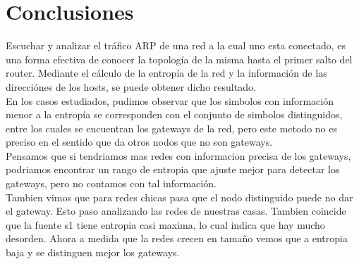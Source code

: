 \section{Conclusiones}

Escuchar y analizar el tráfico ARP de una red a la cual uno esta conectado, 
es una forma efectiva de conocer la topología de la misma hasta el primer salto del router.
Mediante el cálculo de la entropía de la red y la información de las direcciónes de los hosts, se puede obtener dicho resultado.\\
En los casos estudiados, pudimos observar que los simbolos con información menor a la entropía se corresponden con el conjunto de simbolos distinguidos, entre los cuales se encuentran los gateways de la red, pero este metodo no es preciso en el sentido que da otros nodos que no son gateways.\\
Pensamos que si tendriamos mas redes con informacion precisa de los gateways, podriamos encontrar un rango de entropia que ajuste mejor para detectar los gateways, pero no contamos con tal información.\\
Tambien vimos que para redes chicas pasa que el nodo distinguido puede no dar el gateway. Esto paso analizando las redes de nuestras casas. Tambien coincide que la fuente s1 tiene entropia casi maxima, lo cual indica que hay mucho desorden. Ahora a medida que la redes crecen en tamaño vemos que a entropia baja y se distinguen mejor los gateways. 
